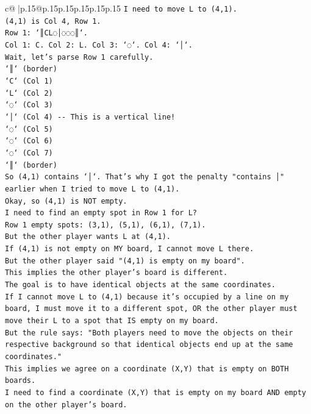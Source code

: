 \documentclass{article}
\begin{document}
{\begin{supertabular}{c@{$\;$}|p{.15\linewidth}@{}p{.15\linewidth}p{.15\linewidth}p{.15\linewidth}p{.15\linewidth}p{.15\linewidth}}
{{{\texttt{I need to move L to (4,1).} \\
\texttt{(4,1) is Col 4, Row 1.} \\
\texttt{Row 1: `║CL◌│◌◌◌║`.} \\
\texttt{Col 1: C. Col 2: L. Col 3: `◌`. Col 4: `│`.} \\
\texttt{Wait, let's parse Row 1 carefully.} \\
\texttt{`║` (border)} \\
\texttt{`C` (Col 1)} \\
\texttt{`L` (Col 2)} \\
\texttt{`◌` (Col 3)} \\
\texttt{`│` (Col 4) {-}{-} This is a vertical line!} \\
\texttt{`◌` (Col 5)} \\
\texttt{`◌` (Col 6)} \\
\texttt{`◌` (Col 7)} \\
\texttt{`║` (border)} \\
\texttt{So (4,1) contains `│`. That's why I got the penalty "contains │" earlier when I tried to move L to (4,1).} \\
\texttt{Okay, so (4,1) is NOT empty.} \\
\texttt{I need to find an empty spot in Row 1 for L?} \\
\texttt{Row 1 empty spots: (3,1), (5,1), (6,1), (7,1).} \\
\texttt{But the other player wants L at (4,1).} \\
\texttt{If (4,1) is not empty on MY board, I cannot move L there.} \\
\texttt{But the other player said "(4,1) is empty on my board".} \\
\texttt{This implies the other player's board is different.} \\
\texttt{The goal is to have identical objects at the same coordinates.} \\
\texttt{If I cannot move L to (4,1) because it's occupied by a line on my board, I must move it to a different spot, OR the other player must move their L to a spot that IS empty on my board.} \\
\texttt{But the rule says: "Both players need to move the objects on their respective background so that identical objects end up at the same coordinates."} \\
\texttt{This implies we agree on a coordinate (X,Y) that is empty on BOTH boards.} \\
\texttt{I need to find a coordinate (X,Y) that is empty on my board AND empty on the other player's board.} \\
}}}
\end{supertabular}}
\end{document}
